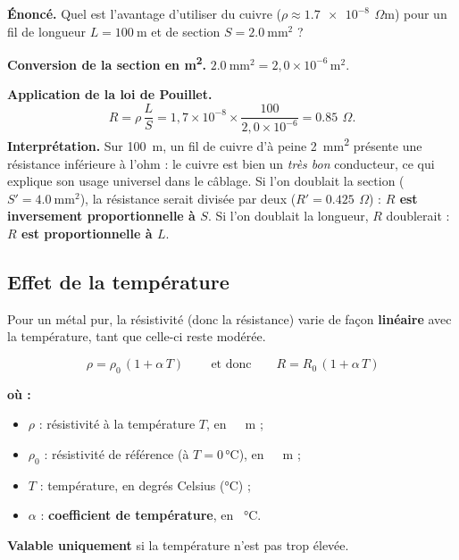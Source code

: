 \documentclass[11pt,a4paper]{article}
\newenvironment{ou}{%
  \par\smallskip\noindent\textbf{où :}\nopagebreak
  \begin{itemize}[leftmargin=1.8em,topsep=2pt,itemsep=1.5pt,parsep=0pt]}%
  {\end{itemize}}
\newcommand{\ohm}{\,\Omega}
\begin{document}
\begin{exemple}
\textbf{Énoncé.} Quel est l'avantage d'utiliser du cuivre ($\rho\approx\SI{1,7e-8}{\ohm\metre}$) pour
un fil de longueur $L=\SI{100}{\metre}$ et de section $S=\SI{2,0}{\milli\metre\squared}$ ?

\smallskip
\textbf{Conversion de la section en \si{\metre\squared}.} \;
$\SI{2,0}{\milli\metre\squared} = 2{,}0\times10^{-6}\,\si{\metre\squared}$.

\textbf{Application de la loi de Pouillet.}
\[ R = \rho\,\frac{L}{S} = 1{,}7\times10^{-8}\times\frac{100}{2{,}0\times10^{-6}}
   = \SI{0,85}{\ohm}. \]
\textbf{Interprétation.} Sur \SI{100}{\metre}, un fil de cuivre d'à peine \SI{2}{\milli\metre\squared}
présente une résistance inférieure à l'ohm : le cuivre est bien un \emph{très bon} conducteur, ce qui
explique son usage universel dans le câblage. Si l'on doublait la section ($S'=\SI{4,0}{\milli\metre\squared}$),
la résistance serait divisée par deux ($R'=\SI{0,425}{\ohm}$) : \textbf{$R$ est inversement
proportionnelle à $S$}. Si l'on doublait la longueur, $R$ doublerait : \textbf{$R$ est proportionnelle à $L$}.
\end{exemple}

\subsection{Effet de la température}

Pour un métal pur, la résistivité (donc la résistance) varie de façon \textbf{linéaire} avec la
température, tant que celle-ci reste modérée.

\begin{formule}
\[ \boxed{\,\rho = \rho_0\,(1 + \alpha\,T)\,} \qquad\text{et donc}\qquad
   R = R_0\,(1 + \alpha\,T) \]
\begin{ou}
  \item $\rho$ : résistivité à la température $T$, en \si{\ohm\metre} ;
  \item $\rho_0$ : résistivité de référence (à $T=0\,\si{\degreeCelsius}$), en \si{\ohm\metre} ;
  \item $T$ : température, en degrés Celsius (\si{\degreeCelsius}) ;
  \item $\alpha$ : \textbf{coefficient de température}, en \si{\per\degreeCelsius}.
\end{ou}
\textbf{Valable uniquement} si la température n'est pas trop élevée.
\end{formule}
\end{document}
